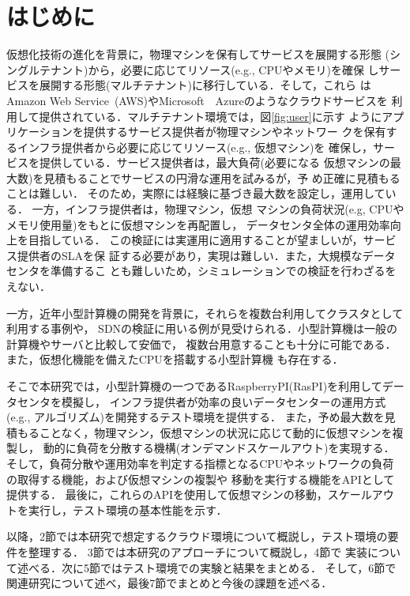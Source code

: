 \documentclass[submit,techrep]{ipsj}
\begin{document}
\maketitle

\section{はじめに}
仮想化技術の進化を背景に，物理マシンを保有してサービスを展開する形態
(シングルテナント)から，必要に応じてリソース(e.g., CPUやメモリ)を確保
しサービスを展開する形態(マルチテナント)に移行している．そして，これら
はAmazon Web Service~(AWS)やMicrosoft　Azureのようなクラウドサービスを
利用して提供されている．マルチテナント環境では，図\ref{fig:user}に示す
ようにアプリケーションを提供するサービス提供者が物理マシンやネットワー
クを保有するインフラ提供者から必要に応じてリソース(e.g., 仮想マシン)を
確保し，サービスを提供している．サービス提供者は，最大負荷(必要になる
仮想マシンの最大数)を見積もることでサービスの円滑な運用を試みるが，予
め正確に見積もることは難しい．
そのため，実際には経験に基づき最大数を設定し，運用している．
一方，インフラ提供者は，物理マシン，仮想
マシンの負荷状況(e.g, CPUやメモリ使用量)をもとに仮想マシンを再配置し，
データセンタ全体の運用効率向上を目指している\cite{cloud1}\cite{cloud2}．
この検証には実運用に適用することが望ましいが，サービス提供者のSLAを保
証する必要があり，実現は難しい．また，大規模なデータセンタを準備するこ
とも難しいため，シミュレーションでの検証を行わざるをえない\cite{testbed}．

一方，近年小型計算機の開発を背景に，それらを複数台利用してクラスタとして利用する事例や，
SDNの検証に用いる例が見受けられる．小型計算機は一般の計算機やサーバと比較して安価で，
複数台用意することも十分に可能である．また，仮想化機能を備えたCPUを搭載する小型計算機
も存在する．

そこで本研究では，小型計算機の一つであるRaspberryPI(RasPI)を利用してデータセンタを模擬し，
インフラ提供者が効率の良いデータセンターの運用方式(e.g., アルゴリズム)を開発するテスト環境を提供する．
また，予め最大数を見積もることなく，物理マシン，仮想マシンの状況に応じて動的に仮想マシンを複製し，
動的に負荷を分散する機構(オンデマンドスケールアウト)を実現する．
そして，負荷分散や運用効率を判定する指標となるCPUやネットワークの負荷の取得する機能，および仮想マシンの複製や
移動を実行する機能をAPIとして提供する．
最後に，これらのAPIを使用して仮想マシンの移動，スケールアウトを実行し，テスト環境の基本性能を示す．

以降，2節では本研究で想定するクラウド環境について概説し，テスト環境の要件を整理する．
3節では本研究のアプローチについて概説し，4節で
実装について述べる．次に5節ではテスト環境での実験と結果をまとめる．
そして，6節で関連研究について述べ，最後7節でまとめと今後の課題を述べる．
\end{document}
